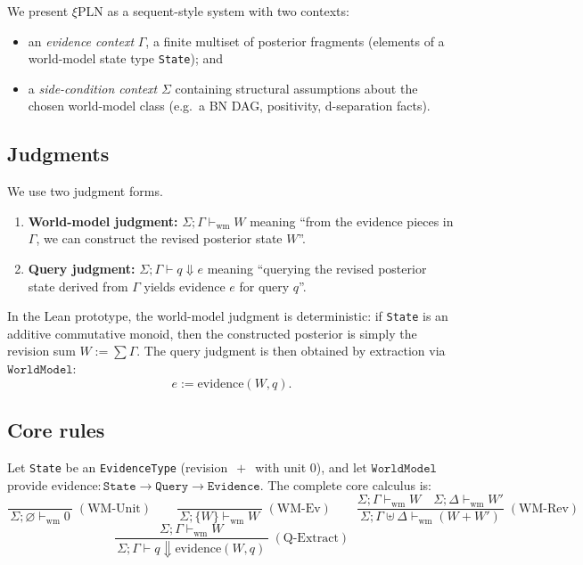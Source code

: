 \documentclass[]{article}
\newcommand{\xiPLN}{\texorpdfstring{$\xi$}{xi}\textup{PLN}}
\newcommand{\code}[1]{\texttt{#1}}
\newcommand{\ty}[1]{\ensuremath{\mathtt{#1}}}
\newcommand{\Evidence}{\ty{Evidence}}
\newcommand{\WorldModel}{\ty{WorldModel}}
\begin{document}
We present \xiPLN{} as a sequent-style system with two contexts:
\begin{itemize}
\item an \emph{evidence context} $\Gamma$, a finite multiset of posterior fragments (elements of a
  world-model state type \code{State}); and
\item a \emph{side-condition context} $\Sigma$ containing structural assumptions about the chosen
  world-model class (e.g.\ a BN DAG, positivity, d-separation facts).
\end{itemize}

\subsection{Judgments}

We use two judgment forms.
\begin{enumerate}
\item \textbf{World-model judgment:} $\Sigma;\Gamma \vdash_{\mathrm{wm}} W$ meaning ``from the
  evidence pieces in $\Gamma$, we can construct the revised posterior state $W$''.
\item \textbf{Query judgment:} $\Sigma;\Gamma \vdash q \Downarrow e$ meaning ``querying the
  revised posterior state derived from $\Gamma$ yields evidence $e$ for query $q$''.
\end{enumerate}

In the Lean prototype, the world-model judgment is deterministic: if \code{State} is an
additive commutative monoid, then the constructed posterior is simply the revision sum
$W := \sum \Gamma$.  The query judgment is then obtained by extraction via \WorldModel{}:
\[
  e := \mathrm{evidence}(W,q).
\]

\subsection{Core rules}

Let \code{State} be an \code{EvidenceType} (revision $\,+\,$ with unit $0$), and let \WorldModel{}
provide $\mathrm{evidence} : \code{State} \to \code{Query} \to \Evidence$.
The complete core calculus is:
\[
\frac{}{\,\Sigma;\varnothing \vdash_{\mathrm{wm}} 0\,}\;(\mathrm{WM\text{-}Unit})
\qquad
\frac{}{\,\Sigma;\{W\} \vdash_{\mathrm{wm}} W\,}\;(\mathrm{WM\text{-}Ev})
\qquad
\frac{\Sigma;\Gamma \vdash_{\mathrm{wm}} W \quad \Sigma;\Delta \vdash_{\mathrm{wm}} W'}
     {\,\Sigma;\Gamma \uplus \Delta \vdash_{\mathrm{wm}} (W+W')\,}\;(\mathrm{WM\text{-}Rev})
\]
\[
\frac{\Sigma;\Gamma \vdash_{\mathrm{wm}} W}
     {\,\Sigma;\Gamma \vdash q \Downarrow \mathrm{evidence}(W,q)\,}\;(\mathrm{Q\text{-}Extract})
\]
\end{document}

